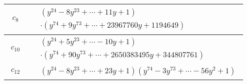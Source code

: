 \documentclass[1p]{elsarticle_modified}
\theoremstyle{definition}
\begin{document}
\begin{tabular}{m{50pt}|m{274pt}}
\hline $$\begin{aligned}c_{8}\end{aligned}$$&$\begin{aligned}
&(y^{24}-8 y^{23}+\cdots+11 y+1)\\
&\cdot(y^{74}+9 y^{73}+\cdots+23967760 y+1194649)
\end{aligned}$\\
\hline $$\begin{aligned}c_{10}\end{aligned}$$&$\begin{aligned}
&(y^{24}+5 y^{23}+\cdots-10 y+1)\\
&\cdot(y^{74}+90 y^{73}+\cdots+2650383495 y+344807761)
\end{aligned}$\\
\hline $$\begin{aligned}c_{12}\end{aligned}$$&$\begin{aligned}
&(y^{24}-8 y^{23}+\cdots+23 y+1)(y^{74}-3 y^{73}+\cdots-56 y^2+1)
\end{aligned}$\\
\hline
\end{tabular}
\vskip 2pc
\end{document}
